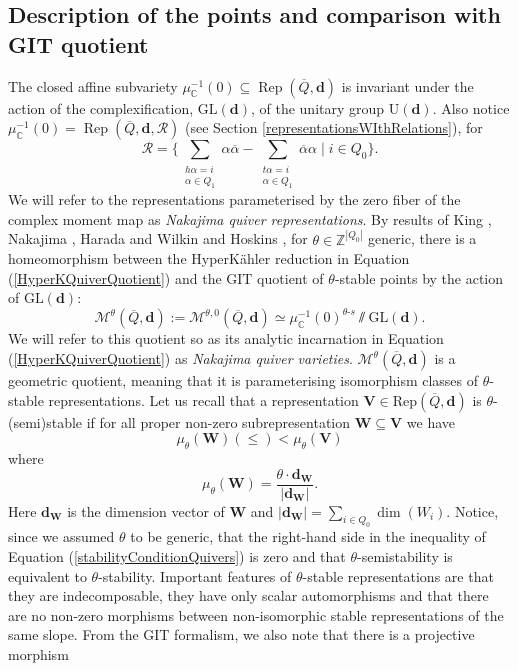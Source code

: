 \documentclass{amsart}
\theoremstyle{plain}
\numberwithin{equation}{section}
\theoremstyle{definition}
\theoremstyle{remark}
\begin{document}
	\subsection{Description of the points and comparison with GIT quotient}\label{GITDescriptionNakajimaQuiverVarieties}
	The closed affine subvariety $\mu^{-1}_{\mathbb{C}}(0)\subseteq\operatorname{Rep}(\overline{Q},\mathbf{d})$ is invariant under the action of the complexification, $\text{GL}(\mathbf{d})$, of the unitary group $\text{U}(\mathbf{d})$. Also notice $\mu^{-1}_{\mathbb{C}}(0)=\operatorname{Rep}(\overline{Q},\mathbf{d},\mathcal{R})$ (see Section \ref{representationsWIthRelations}), for 
	$$
	\mathcal{R}=\{\sum_{\substack{h\alpha=i\\ \alpha\in Q_1}}\alpha \overline{\alpha}-\sum_{\substack{t\alpha=i\\ \alpha\in Q_1}}\overline{\alpha}\alpha \mid i\in Q_0 \}.
	$$
	We will refer to the representations parameterised by the zero fiber of the complex moment map as \emph{Nakajima quiver representations}. By results of King \cite{KingModuli}, Nakajima \cite{Nakajima}, Harada and Wilkin \cite{HaradaWilkin} and Hoskins \cite{HoskinsStratifications}, for $\theta\in \mathbb{Z}^{|Q_0|}$ generic, there is a homeomorphism between the HyperKähler reduction in Equation (\ref{HyperKQuiverQuotient}) and the GIT quotient of $\theta$-stable points by the action of $\text{GL}(\mathbf{d})$:
	$$
	\mathcal{M}^{\theta}(\overline{Q},\mathbf{d}):=\mathcal{M}^{\theta,0}(\overline{Q},\mathbf{d})\simeq \mu^{-1}_\mathbb{C}(0)^{\theta\text{-}s}\sslash\text{GL}(\mathbf{d}).
	$$
	We will refer to this quotient so as its analytic incarnation in Equation (\ref{HyperKQuiverQuotient}) as \emph{Nakajima quiver varieties}.  $\mathcal{M}^\theta(\overline{Q},\mathbf{d})$ is a geometric quotient, meaning that it is parameterising isomorphism classes of $\theta$-stable representations. 
	Let us recall that a representation $\mathbf{V}\in \text{Rep}(\overline{Q},\mathbf{d})$ is $\theta$-(semi)stable if for all proper non-zero subrepresentation $\mathbf{W}\subseteq \mathbf{V}$ we have 
	\begin{equation}\label{stabilityConditionQuivers}
		\mu_{\theta}(\mathbf{W})(\leq)<\mu_{\theta}(\mathbf{V})
	\end{equation}
	where 
	$$
	\mu_{\theta}(\mathbf{W})=\frac{\theta\cdot\mathbf{d}_{\mathbf{W}}}{|\mathbf{d}_{\mathbf{W}}|}.
	$$
	Here $\mathbf{d}_{\mathbf{W}}$ is the dimension vector of $\mathbf{W}$ and $|\mathbf{d}_\mathbf{W}|=\sum_{i\in Q_0}\dim(W_i)$. Notice, since we assumed $\theta$ to be generic, that the right-hand side in the inequality of Equation (\ref{stabilityConditionQuivers}) is zero and that $\theta$-semistability is equivalent to $\theta$-stability. Important features of $\theta$-stable representations are that they are indecomposable, they have only scalar automorphisms and that there are no non-zero morphisms between non-isomorphic stable representations of the same slope. From the GIT formalism, we also note that there is a projective morphism
\end{document}
